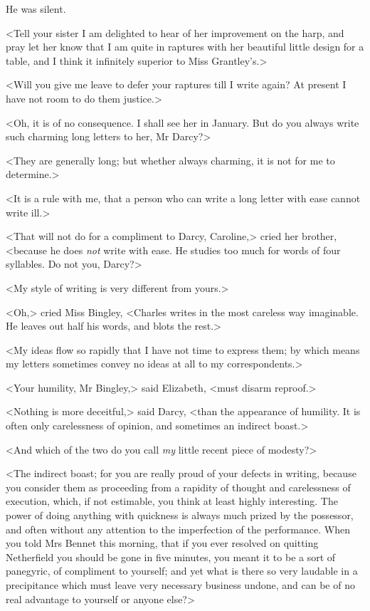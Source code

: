 He was silent.

<Tell your sister I am delighted to hear of her improvement on the harp, and pray let her know that I am quite in raptures with her beautiful little design for a table, and I think it infinitely superior to Miss Grantley's.>

<Will you give me leave to defer your raptures till I write again? At present I have not room to do them justice.>

<Oh, it is of no consequence. I shall see her in January. But do you always write such charming long letters to her, Mr Darcy?>

<They are generally long; but whether always charming, it is not for me to determine.>

<It is a rule with me, that a person who can write a long letter with ease cannot write ill.>

<That will not do for a compliment to Darcy, Caroline,> cried her brother, <because he does \textit{not} write with ease. He studies too much for words of four syllables. Do not you, Darcy?>

<My style of writing is very different from yours.>

<Oh,> cried Miss Bingley, <Charles writes in the most careless way imaginable. He leaves out half his words, and blots the rest.>

<My ideas flow so rapidly that I have not time to express them; by which means my letters sometimes convey no ideas at all to my correspondents.>

<Your humility, Mr Bingley,> said Elizabeth, <must disarm reproof.>

<Nothing is more deceitful,> said Darcy, <than the appearance of humility. It is often only carelessness of opinion, and sometimes an indirect boast.>

<And which of the two do you call \textit{my} little recent piece of modesty?>

<The indirect boast; for you are really proud of your defects in writing, because you consider them as proceeding from a rapidity of thought and carelessness of execution, which, if not estimable, you think at least highly interesting. The power of doing anything with quickness is always much prized by the possessor, and often without any attention to the imperfection of the performance. When you told Mrs Bennet this morning, that if you ever resolved on quitting Netherfield you should be gone in five minutes, you meant it to be a sort of panegyric, of compliment to yourself; and yet what is there so very laudable in a precipitance which must leave very necessary business undone, and can be of no real advantage to yourself or anyone else?>

